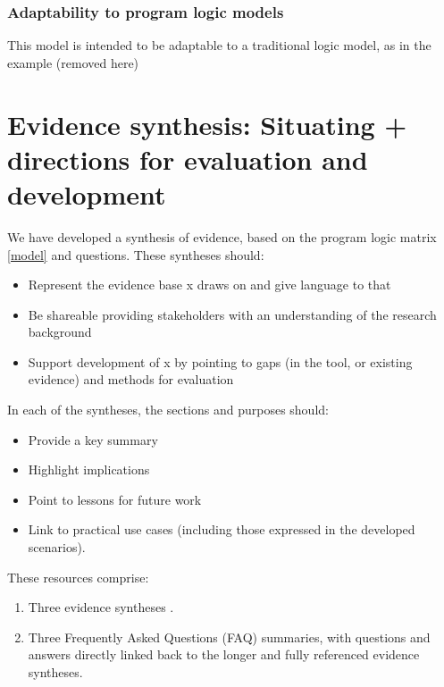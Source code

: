 \documentclass[
]{book}
\providecommand{\tightlist}{%
  \setlength{\itemsep}{0pt}\setlength{\parskip}{0pt}}
\begin{document}
\label{fig:model}

\hypertarget{adaptability-to-program-logic-models}{%
\subsection{Adaptability to program logic models}\label{adaptability-to-program-logic-models}}

This model is intended to be adaptable to a traditional logic model, as in the example (removed here)

\hypertarget{evidence-synthesis}{%
\chapter{Evidence synthesis: Situating + directions for evaluation and development}\label{evidence-synthesis}}

We have developed a synthesis of evidence, based on the program logic matrix \ref{model} and questions. These syntheses should:

\begin{itemize}
\tightlist
\item
  Represent the evidence base x draws on and give language to that
\item
  Be shareable providing stakeholders with an understanding of the research background
\item
  Support development of x by pointing to gaps (in the tool, or existing evidence) and methods for evaluation
\end{itemize}

In each of the syntheses, the sections and purposes should:

\begin{itemize}
\tightlist
\item
  Provide a key summary
\item
  Highlight implications\\
\item
  Point to lessons for future work
\item
  Link to practical use cases (including those expressed in the developed scenarios).
\end{itemize}

These resources comprise:

\begin{enumerate}
\def\labelenumi{\arabic{enumi}.}
\tightlist
\item
  {Three evidence syntheses }.
\item
  {Three Frequently Asked Questions (FAQ) summaries, with questions and answers directly linked back to the longer and fully referenced evidence syntheses}.
\end{enumerate}
\end{document}
